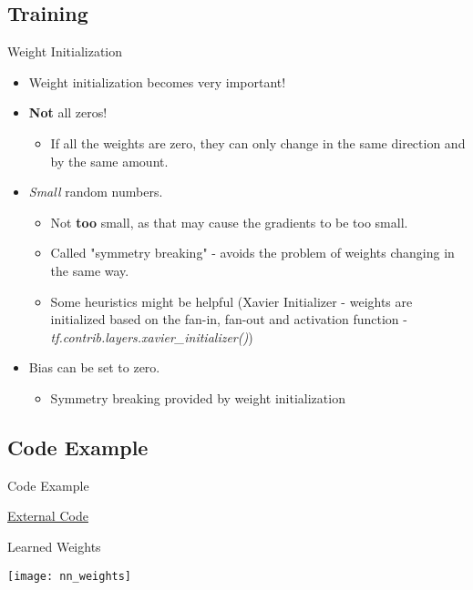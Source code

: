 \subsection{Training}
\begin{frame}{Weight Initialization}
	\begin{itemize}
		\item Weight initialization becomes very important!
		\item \textbf{Not} all zeros!
		\begin{itemize}
			\item If all the weights are zero, they can only change in the same direction and by the same amount.
		\end{itemize}
		\item \textit{Small} random numbers.
		\begin{itemize}
			\item Not \textbf{too} small, as that may cause the gradients to be too small.
			\item Called "symmetry breaking" - avoids the problem of weights changing in the same way.
			\item Some heuristics might be helpful (Xavier Initializer - weights are initialized based on the fan-in, fan-out and activation function - \textit{tf.contrib.layers.xavier\_initializer()})
		\end{itemize}
		\item Bias can be set to zero.
		\begin{itemize}
			\item Symmetry breaking provided by weight initialization
		\end{itemize}
	\end{itemize}
\end{frame}


\subsection{Code Example}
\begin{frame}{Code Example}
	\begin{center}
		\textcolor{blue!75}{\underline{ \href{https://github.com/davifrossard/iml/blob/master/04_LogRegAndNN/Sample_Code/Neural Network.py}{External Code}}}
	\end{center}
\end{frame}

\begin{frame}{Learned Weights}
	\begin{center}
		\texttt{[image: nn\_weights]}
	\end{center}
\end{frame}


